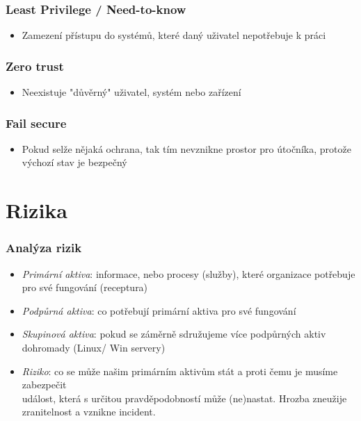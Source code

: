 \documentclass[10pt,a4paper]{article}
\begin{document}
\subsubsection*{Least Privilege / Need-to-know}
\begin{itemize}
    \item Zamezení přístupu do systémů, které daný uživatel nepotřebuje k práci
\end{itemize}

\subsubsection*{Zero trust}
\begin{itemize}
    \item Neexistuje "důvěrný" uživatel, systém nebo zařízení
\end{itemize}

\subsubsection*{Fail secure}
\begin{itemize}
    \item Pokud selže nějaká ochrana, tak tím nevznikne prostor pro útočníka, protože výchozí stav je bezpečný
\end{itemize}


\section{Rizika}

\subsubsection*{Analýza rizik}
\begin{itemize}
    \item \textit{Primární aktiva}: informace, nebo procesy (služby), které organizace potřebuje pro své fungování (receptura)
    \item \textit{Podpůrná aktiva}: co potřebují primární aktiva pro své fungování
    \item \textit{Skupinová aktiva}: pokud se záměrně sdružujeme více podpůrných aktiv dohromady (Linux/ Win servery)
    \item \textit{Riziko}: co se může našim primárním aktivům stát a proti čemu je musíme zabezpečit\\
    událost, která s určitou pravděpodobností může (ne)nastat. Hrozba zneužije zranitelnost a vznikne incident.
\end{itemize}
\end{document}
